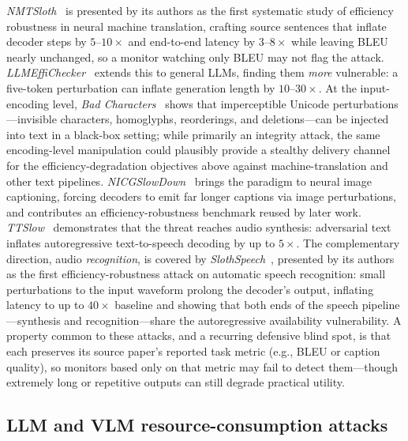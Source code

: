 \documentclass[acmsmall,screen,review,nonacm]{acmart}
\begin{document}
\emph{NMTSloth}~\cite{chen2022nmtsloth} is presented by its authors as the first systematic study of efficiency robustness in neural machine translation, crafting source sentences that inflate decoder steps by $5$--$10\times$ and end-to-end latency by $3$--$8\times$ while leaving BLEU nearly unchanged, so a monitor watching only BLEU may not flag the attack. \emph{LLMEffiChecker}~\cite{feng2022llmeffichecker} extends this to general LLMs, finding them \emph{more} vulnerable: a five-token perturbation can inflate generation length by $10$--$30\times$. At the input-encoding level, \emph{Bad Characters}~\cite{boucher2022badchars} shows that imperceptible Unicode perturbations---invisible characters, homoglyphs, reorderings, and deletions---can be injected into text in a black-box setting; while primarily an integrity attack, the same encoding-level manipulation could plausibly provide a stealthy delivery channel for the efficiency-degradation objectives above against machine-translation and other text pipelines. \emph{NICGSlowDown}~\cite{chen2022nicgslowdown} brings the paradigm to neural image captioning, forcing decoders to emit far longer captions via image perturbations, and contributes an efficiency-robustness benchmark reused by later work. \emph{TTSlow}~\cite{gao2024ttslow} demonstrates that the threat reaches audio synthesis: adversarial text inflates autoregressive text-to-speech decoding by up to $5\times$. The complementary direction, audio \emph{recognition}, is covered by \emph{SlothSpeech}~\cite{haque2023slothspeech}, presented by its authors as the first efficiency-robustness attack on automatic speech recognition: small perturbations to the input waveform prolong the decoder's output, inflating latency to up to $40\times$ baseline and showing that both ends of the speech pipeline---synthesis and recognition---share the autoregressive availability vulnerability. A property common to these attacks, and a recurring defensive blind spot, is that each preserves its source paper's reported task metric (e.g., BLEU or caption quality), so monitors based only on that metric may fail to detect them---though extremely long or repetitive outputs can still degrade practical utility.

\subsection{LLM and VLM resource-consumption attacks}
\label{sec:llm}
\end{document}

